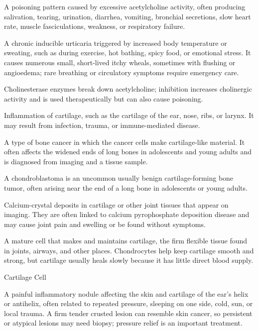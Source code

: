  A poisoning pattern caused by excessive acetylcholine activity, often producing salivation, tearing, urination, diarrhea, vomiting, bronchial secretions, slow heart rate, muscle fasciculations, weakness, or respiratory failure.

 A chronic inducible urticaria triggered by increased body temperature or sweating, such as during exercise, hot bathing, spicy food, or emotional stress. It causes numerous small, short-lived itchy wheals, sometimes with flushing or angioedema; rare breathing or circulatory symptoms require emergency care.

 Cholinesterase enzymes break down acetylcholine; inhibition increases cholinergic activity and is used therapeutically but can also cause poisoning.

 Inflammation of cartilage, such as the cartilage of the ear, nose, ribs, or larynx. It
may result from infection, trauma, or immune-mediated disease.

 A type of bone cancer in which the cancer cells make cartilage-like material. It often affects the widened ends of long bones in adolescents and young adults and is diagnosed from imaging and a tissue sample.

 A chondroblastoma is an uncommon usually benign cartilage-forming bone tumor, often arising near the end of a long bone in adolescents or young adults.

 Calcium-crystal deposits in cartilage or other joint tissues that appear on imaging. They are often linked to calcium pyrophosphate deposition disease and may cause joint pain and swelling or be found without symptoms.

 A mature cell that makes and maintains cartilage, the firm flexible tissue found in joints, airways, and other places. Chondrocytes help keep cartilage smooth and strong, but cartilage usually heals slowly because it has little direct blood supply.

\synonyms
Cartilage Cell

 A painful inflammatory nodule affecting the skin and cartilage of the ear’s helix or antihelix, often related to repeated pressure, sleeping on one side, cold, sun, or local trauma. A firm tender crusted lesion can resemble skin cancer, so persistent or atypical lesions may need biopsy; pressure relief is an important treatment.

